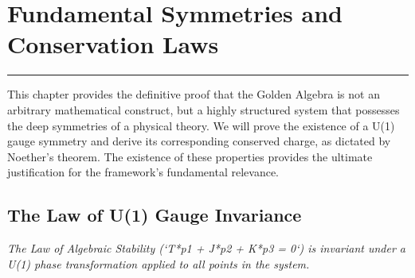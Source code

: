 







\section{Fundamental Symmetries and Conservation Laws}
\label{sec:fundamental_symmetries}

\hrule
\vspace{1em}
This chapter provides the definitive proof that the Golden Algebra is not an arbitrary mathematical construct, but a highly structured system that possesses the deep symmetries of a physical theory. We will prove the existence of a U(1) gauge symmetry and derive its corresponding conserved charge, as dictated by Noether's theorem. The existence of these properties provides the ultimate justification for the framework's fundamental relevance.

\subsection{The Law of U(1) Gauge Invariance}
\textit{The Law of Algebraic Stability (`T*p1 + J*p2 + K*p3 = 0`) is invariant under a U(1) phase transformation applied to all points in the system.}


